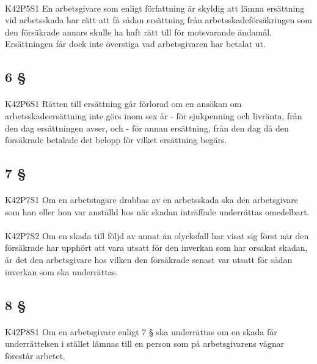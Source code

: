 \documentclass[a4paper,notitlepage,openany,10pt]{book}
\begin{document}
\paragraph*{}
{\tiny K42P5S1}
En arbetsgivare som enligt författning är skyldig att lämna ersättning vid arbetsskada har rätt att få sådan ersättning från arbetsskadeförsäkringen som den försäkrade annars skulle ha haft rätt till för motsvarande ändamål.
Ersättningen får dock inte överstiga vad arbetsgivaren har betalat ut.
\subsection*{6 §}
\paragraph*{}
{\tiny K42P6S1}
Rätten till ersättning går förlorad om en ansökan om arbetsskadeersättning inte görs inom sex år
\newline - för sjukpenning och livränta, från den dag ersättningen avser, och
\newline - för annan ersättning, från den dag då den försäkrade betalade det belopp för vilket ersättning begärs.
\subsection*{7 §}
\paragraph*{}
{\tiny K42P7S1}
Om en arbetstagare drabbas av en arbetsskada ska den arbetsgivare som han eller hon var anställd hos när skadan inträffade underrättas omedelbart.
\paragraph*{}
{\tiny K42P7S2}
Om en skada till följd av annat än olycksfall har visat sig först när den försäkrade har upphört att vara utsatt för den inverkan som har orsakat skadan, är det den arbetsgivare hos vilken den försäkrade senast var utsatt för sådan inverkan som ska underrättas.
\subsection*{8 §}
\paragraph*{}
{\tiny K42P8S1}
Om en arbetsgivare enligt 7 § ska underrättas om en skada får underrättelsen i stället lämnas till en person som på arbetsgivarens vägnar förestår arbetet.
\end{document}
